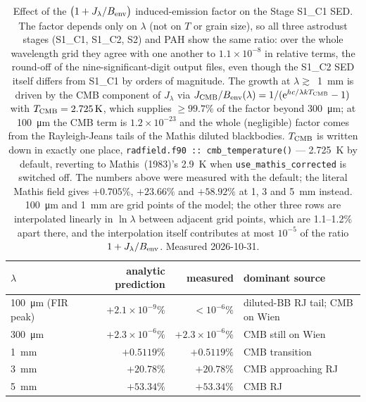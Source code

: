 \documentclass{my_memo}
\begin{document}
\begin{table}[h]
\centering
\begin{tabular}{l r r l}
\toprule
$\lambda$ & analytic prediction & measured & dominant source \\
\midrule
\SI{100}{\micro\meter} (FIR peak)   & $+2.1\times10^{-9}\%$ & $<10^{-6}\%$          & diluted-BB RJ tail; CMB on Wien \\
\SI{300}{\micro\meter}              & $+2.3\times10^{-6}\%$ & $+2.3\times10^{-6}\%$ & CMB still on Wien \\
\SI{1}{\milli\meter}                & $+0.5119\%$           & $+0.5119\%$           & CMB transition \\
\SI{3}{\milli\meter}                & $+20.78\%$            & $+20.78\%$            & CMB approaching RJ \\
\SI{5}{\milli\meter}                & $+53.34\%$            & $+53.34\%$            & CMB RJ \\
\bottomrule
\end{tabular}
\caption{Effect of the $\bigl(1 + J_\lambda/B_{\rm env}\bigr)$
induced-emission factor on the Stage S1\_C1 SED. The factor depends
only on $\lambda$ (not on $T$ or grain size), so all three astrodust
stages (S1\_C1, S1\_C2, S2) and PAH show the same ratio: over the whole
wavelength grid they agree with one another to $1.1\times10^{-8}$ in
relative terms, the round-off of the nine-significant-digit output
files, even though the S1\_C2 SED itself differs from S1\_C1 by orders
of magnitude. The growth at $\lambda \gtrsim$~\SI{1}{\milli\meter} is
driven by the CMB component of $J_\lambda$ via
$J_{\rm CMB}/B_{\rm env}(\lambda) = 1/(\mathrm{e}^{hc/\lambda k
T_{\rm CMB}} - 1)$ with $T_{\rm CMB} = \SI{2.725}{K}$, which supplies
$\ge 99.7\%$ of the factor beyond \SI{300}{\micro\meter}; at
\SI{100}{\micro\meter} the CMB term is $1.2\times10^{-23}$ and the
whole (negligible) factor comes from the Rayleigh-Jeans tails of the
Mathis diluted blackbodies. $T_{\rm CMB}$ is written down in exactly
one place, \texttt{radfield.f90 :: cmb\_temperature()} ---
\SI{2.725}{K} by default, reverting to Mathis~(1983)'s \SI{2.9}{K}
when \texttt{use\_mathis\_corrected} is switched off. The numbers above
were measured with the default; the literal Mathis field gives
$+0.705\%$, $+23.66\%$ and $+58.92\%$ at 1, 3 and \SI{5}{\milli\meter}
instead. \SI{100}{\micro\meter} and \SI{1}{\milli\meter} are grid
points of the model; the other three rows are interpolated linearly in
$\ln\lambda$ between adjacent grid points, which are 1.1--1.2\% apart
there, and the interpolation itself contributes at most $10^{-5}$ of
the ratio $1 + J_\lambda/B_{\rm env}$. Measured 2026-10-31.}
\label{tab:induced_ratio}
\end{table}
\end{document}
